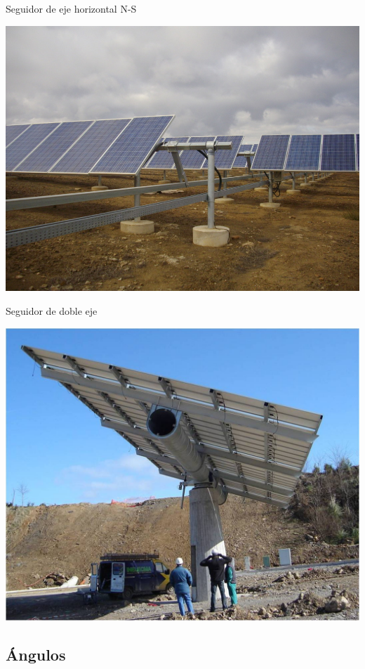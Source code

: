 \documentclass[xcolor={usenames,svgnames,dvipsnames}]{beamer}
\begin{document}
\begin{frame}[label={sec:orgf92e18a}]{Seguidor de eje horizontal N-S}
\begin{center}
\includegraphics[width=.9\linewidth]{../figs/SeguidorEjeHorizontal.jpg}
\end{center}
\end{frame}


\begin{frame}[label={sec:org9268ccf}]{Seguidor de doble eje}
\begin{center}
\includegraphics[width=.9\linewidth]{../figs/SeguidorReocin.jpg}
\end{center}
\end{frame}


\subsection{Ángulos}
\label{sec:org834f549}
\end{document}
